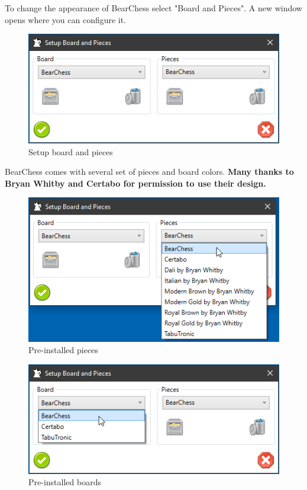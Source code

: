 \documentclass[11pt,a4paper]{article}
\begin{document}
	To change the appearance of BearChess select "Board and Pieces". A new window opens where you can configure it. 
	
	\begin{figure}[H]
		\centering
		\includegraphics[scale=0.9]{SettingsBoardAndPieces2.png}
		\caption{Setup board and pieces }
		\label{fig:SettingsBoardAndPieces2}
	\end{figure}
	
	BearChess comes with several set of pieces and board colors. \textbf{Many thanks to Bryan Whitby and Certabo for permission to use their design.}
	
	\begin{figure}[H]
		\centering
		\includegraphics[scale=0.9]{SettingsBoardAndPieces3.png}
		\caption{Pre-installed pieces }
		\label{fig:SettingsBoardAndPieces3}
	\end{figure}
	
	\begin{figure}[H]
		\centering
		\includegraphics[scale=0.9]{SettingsBoardAndPieces4.png}
		\caption{Pre-installed boards}
		\label{fig:SettingsBoardAndPieces4}
	\end{figure}
	
\end{document}
